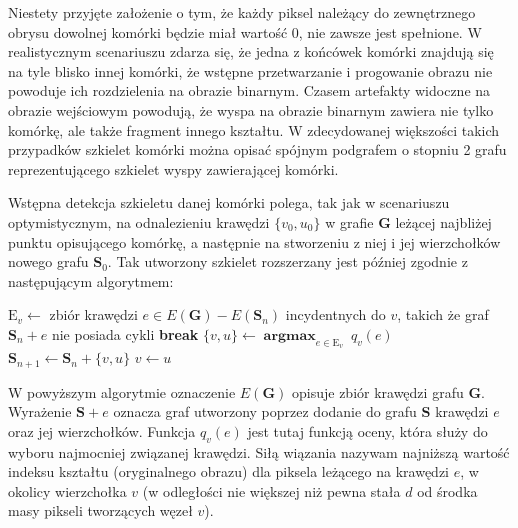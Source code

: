 \documentclass[declaration,shortabstract,mgr]{iithesis}
\DeclareMathOperator*{\argmax}{\textbf{argmax}}
\begin{document}
Niestety przyjęte założenie o tym, że każdy piksel należący do zewnętrznego obrysu dowolnej komórki będzie miał wartość $0$, nie zawsze jest spełnione. W realistycznym scenariuszu zdarza się, że jedna z końcówek komórki znajdują się na tyle blisko innej komórki, że wstępne przetwarzanie i progowanie obrazu nie powoduje ich rozdzielenia na obrazie binarnym. Czasem artefakty widoczne na obrazie wejściowym powodują, że wyspa na obrazie binarnym zawiera nie tylko komórkę, ale także fragment innego kształtu. W zdecydowanej większości takich przypadków szkielet komórki można opisać spójnym podgrafem o stopniu 2 grafu reprezentującego szkielet wyspy zawierającej komórki.

Wstępna detekcja szkieletu danej komórki polega, tak jak w scenariuszu optymistycznym, na odnalezieniu krawędzi $\{v_0, u_0\}$ w grafie $\mathbf{G}$ leżącej najbliżej punktu opisującego komórkę, a następnie na stworzeniu z niej i jej wierzchołków nowego grafu $\mathbf{S}_0$. Tak utworzony szkielet rozszerzany jest później zgodnie z następującym algorytmem:

\begin{algorithm}[H]
\begin{algorithmic}
  \LOOP
    \STATE
      $\text{E}_v \gets$ zbiór krawędzi $e \in E(\mathbf{G}) - E(\mathbf{S}_n)$ incydentnych do $v$,\newline
       takich że graf $\mathbf{S}_n + e$ nie posiada cykli
      \STATE \textbf{break}
    \ENDIF
    \STATE $\{v, u\} \gets \argmax_{e \in \text{E}_v} \ q_v(e)$
    \STATE $\mathbf{S}_{n+1} \gets \mathbf{S}_n + \{v, u\} $
    \STATE $v \gets u$
  \ENDLOOP
\ENDFOR
\end{algorithmic}
\end{algorithm}

\noindent
W powyższym algorytmie oznaczenie $E(\mathbf{G})$ opisuje zbiór krawędzi grafu $\mathbf{G}$.
Wyrażenie $\mathbf{S} + e$ oznacza graf utworzony poprzez dodanie do grafu $\mathbf{S}$ krawędzi $e$ oraz jej wierzchołków.
Funkcja $q_v(e)$ jest tutaj funkcją oceny, która służy do wyboru najmocniej związanej krawędzi. Siłą wiązania nazywam najniższą wartość indeksu kształtu (oryginalnego obrazu) dla piksela leżącego na krawędzi $e$, w okolicy wierzchołka $v$ (w odległości nie większej niż pewna stała $d$ od środka masy pikseli tworzących węzeł $v$).
\end{document}

